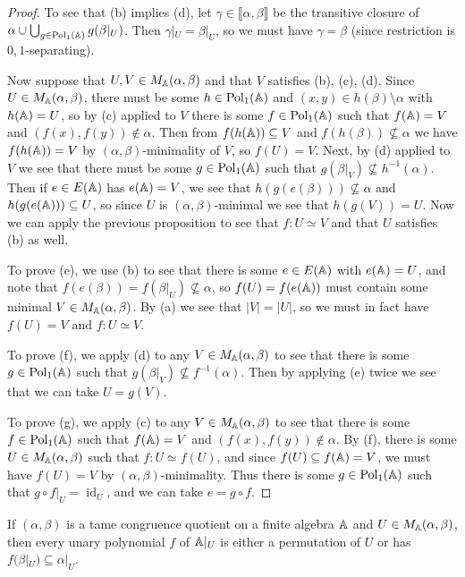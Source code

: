 \begin{appendices}
\begin{proof}
To see that (b) implies (d), let $\gamma \in \llbracket \alpha, \beta \rrbracket$ be the transitive closure of $\alpha \cup \bigcup_{g \in \operatorname{Pol}_1(\mathbb{A})} g(\beta|_U)$. Then $\gamma|_U = \beta|_U$, so we must have $\gamma = \beta$ (since restriction is $0,1$-separating).

Now suppose that $U,V \in M_{\mathbb{A}}(\alpha, \beta)$ and that $V$ satisfies (b), (c), (d). Since $U \in M_{\mathbb{A}}(\alpha,\beta)$, there must be some $h \in \operatorname{Pol}_1(\mathbb{A})$ and $(x,y) \in h(\beta) \setminus \alpha$ with $h(\mathbb{A}) = U$, so by (c) applied to $V$ there is some $f \in \operatorname{Pol}_1(\mathbb{A})$ such that $f(\mathbb{A}) = V$ and $(f(x), f(y)) \not\in \alpha$. Then from $f(h(\mathbb{A})) \subseteq V$ and $f(h(\beta)) \not\subseteq \alpha$ we have $f(h(\mathbb{A})) = V$ by $(\alpha,\beta)$-minimality of $V$, so $f(U) = V$. Next, by (d) applied to $V$ we see that there must be some $g \in \operatorname{Pol}_1(\mathbb{A})$ such that $g(\beta|_V) \not\subseteq h^{-1}(\alpha)$. Then if $e \in E(\mathbb{A})$ has $e(\mathbb{A}) = V$, we see that $h(g(e(\beta))) \not\subseteq \alpha$ and $h(g(e(\mathbb{A}))) \subseteq U$, so since $U$ is $(\alpha,\beta)$-minimal we see that $h(g(V)) = U$. Now we can apply the previous proposition to see that $f : U \simeq V$ and that $U$ satisfies (b) as well.

To prove (e), we use (b) to see that there is some $e \in E(\mathbb{A})$ with $e(\mathbb{A}) = U$, and note that $f(e(\beta)) = f(\beta|_U) \not\subseteq \alpha$, so $f(U) = f(e(\mathbb{A}))$ must contain some minimal $V \in M_{\mathbb{A}}(\alpha,\beta)$. By (a) we see that $|V| = |U|$, so we must in fact have $f(U) = V$ and $f : U \simeq V$.

To prove (f), we apply (d) to any $V \in M_{\mathbb{A}}(\alpha, \beta)$ to see that there is some $g \in \operatorname{Pol}_1(\mathbb{A})$ such that $g(\beta|_V) \not\subseteq f^{-1}(\alpha)$. Then by applying (e) twice we see that we can take $U = g(V)$.

To prove (g), we apply (c) to any $V \in M_{\mathbb{A}}(\alpha, \beta)$ to see that there is some $f \in \operatorname{Pol}_1(\mathbb{A})$ such that $f(\mathbb{A}) = V$ and $(f(x), f(y)) \not\in \alpha$. By (f), there is some $U \in M_{\mathbb{A}}(\alpha, \beta)$ such that $f : U \simeq f(U)$, and since $f(U) \subseteq f(\mathbb{A}) = V$, we must have $f(U) = V$ by $(\alpha,\beta)$-minimality. Thus there is some $g \in \operatorname{Pol}_1(\mathbb{A})$ such that $g\circ f|_U = \operatorname{id}_U$, and we can take $e = g \circ f$.
\end{proof}

\begin{cor} If $(\alpha,\beta)$ is a tame congruence quotient on a finite algebra $\mathbb{A}$ and $U \in M_{\mathbb{A}}(\alpha,\beta)$, then every unary polynomial $f$ of $\mathbb{A}|_U$ is either a permutation of $U$ or has $f(\beta|_U) \subseteq \alpha|_U$.
\end{cor}


\end{appendices}
